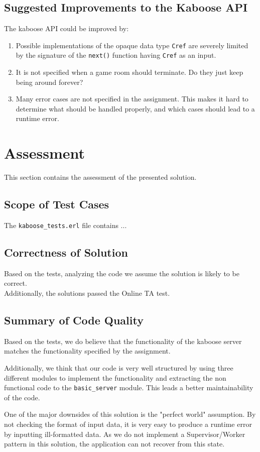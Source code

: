 \documentclass[11pt, a4paper]{article}
\begin{document}
\subsection{Suggested Improvements to the Kaboose API}
The kaboose API could be improved by:
\begin{enumerate}
	\item Possible implementations of the opaque data type \texttt{Cref} are severely limited by the signature of the \texttt{next()} function having \texttt{Cref} as an input.
	\item It is not specified when a game room should terminate. Do they just keep being around forever?
	\item Many error cases are not specified in the assignment. This makes it hard to determine what should be handled properly, and which cases should lead to a runtime error.
\end{enumerate}


\pagebreak
\section{Assessment}
This section contains the assessment of the presented solution.


\subsection{Scope of Test Cases}
The \texttt{kaboose\_tests.erl} file contains ...

\subsection{Correctness of Solution}
Based on the tests, analyzing the code we assume the solution is likely to be correct.
\\
Additionally, the solutions passed the Online TA test.

\subsection{Summary of Code Quality}
Based on the tests, we do believe that the functionality of the kaboose server matches the functionality specified by the assignment.

Additionally, we think that our code is very well structured by using three different modules to implement the functionality and extracting the non functional code to the \texttt{basic\_server} module. This leads a better maintainability of the code.

One of the major downsides of this solution is the "perfect world" assumption. By not checking the format of input data, it is very easy to produce a runtime error by inputting ill-formatted data. As we do not implement a Supervisor/Worker pattern in this solution, the application can not recover from this state.
\end{document}

